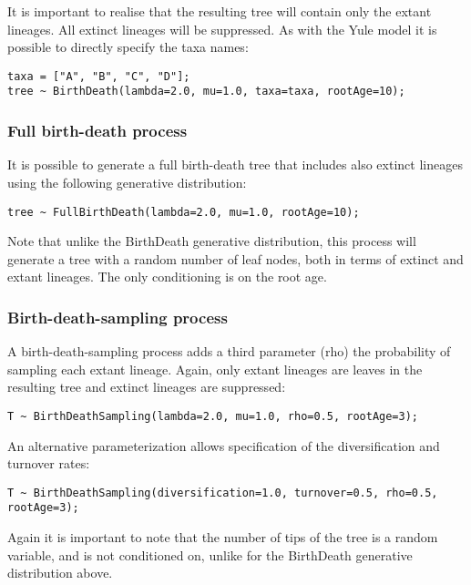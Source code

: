 \documentclass[oneside]{article}
\begin{document}
It is important to realise that the resulting tree will contain only the extant lineages. All extinct lineages will be
suppressed. As with the Yule model it is possible to directly specify the taxa names:

\begin{verbatim}
taxa = ["A", "B", "C", "D"];
tree ~ BirthDeath(lambda=2.0, mu=1.0, taxa=taxa, rootAge=10);
\end{verbatim}

\subsubsection{Full birth-death process}

It is possible to generate a full birth-death tree that includes also extinct lineages using the following generative
distribution:

\begin{verbatim}
tree ~ FullBirthDeath(lambda=2.0, mu=1.0, rootAge=10);
\end{verbatim}

Note that unlike the BirthDeath generative distribution, this process will generate a tree with a random number of
leaf nodes, both in terms of extinct and extant lineages. The only conditioning is on the root age.

\subsubsection{Birth-death-sampling process}

A birth-death-sampling process adds a third parameter (rho) the probability of sampling each extant lineage. Again, 
only extant lineages are leaves in the resulting tree and extinct lineages are suppressed:

\begin{verbatim}
T ~ BirthDeathSampling(lambda=2.0, mu=1.0, rho=0.5, rootAge=3);
\end{verbatim}

An alternative parameterization allows specification of the diversification and turnover rates:

\begin{verbatim}
T ~ BirthDeathSampling(diversification=1.0, turnover=0.5, rho=0.5, rootAge=3);
\end{verbatim}

Again it is important to note that the number of tips of the tree is a random variable, and is not conditioned on,
unlike for the BirthDeath generative distribution above.
\end{document}
